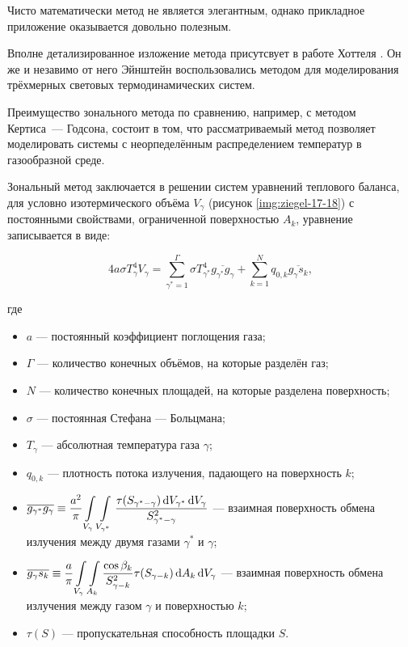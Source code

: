 Чисто математически метод не является элегантным, однако прикладное приложение оказывается довольно полезным.

Вполне детализированное изложение метода присутсвует в работе Хоттеля \cite{hottel-1}.
Он же \cite{hottel-2} и незавимо от него Эйнштейн \cite{einstein-1, einstein-2} воспользовались методом для моделирования трёхмерных световых термодинамических систем.

Преимущество зонального метода по сравнению, например, с методом Кертиса~— Годсона, состоит в том, что рассматриваемый метод позволяет моделировать системы с неорпеделённым распределением температур в газообразной среде.


Зональный метод заключается в решении систем уравнений теплового баланса, для условно изотермического объёма $V_\gamma$ (рисунок \ref{img:ziegel-17-18}) с постоянными свойствами, ограниченной поверхностью $A_k$, уравнение записывается в виде:

\begin{equation}
	4a\sigma T^4_\gamma V_\gamma = \sum_{\gamma^* = 1}^{\Gamma} \sigma T^4_{\gamma^*} \overline{g_{\gamma^*} g_\gamma} + \sum_{k=1}^{N} q_{0, k} \overline{g_\gamma s_k},
\end{equation}

\noindent где
\begin{itemize}
	\item $a$ — постоянный коэффициент поглощения газа;
	\item $\Gamma$ — количество конечных объёмов, на которые разделён газ;
	\item $N$ — количество конечных площадей, на которые разделена поверхность;
	\item $\sigma$ — постоянная Стефана — Больцмана;
	\item $T_\gamma$ — абсолютная температура газа $\gamma$;
	\item $q_{0, k}$ — плотность потока излучения, падающего на поверхность $k$;
	\item $\displaystyle \overline{g_{\gamma^*} g_\gamma} \equiv \frac{a^2}{\pi} \int\displaylimits_{V_\gamma} \int\displaylimits_{V_{\gamma^*}} \frac{\tau(S_{\gamma^*-\gamma}) \,\mathrm dV_{\gamma^*} \,\mathrm dV_\gamma}{S^2_{\gamma^*-\gamma}}$ — взаимная поверхность обмена излучения между двумя газами $\gamma^*$ и $\gamma$;
	\item $\displaystyle \overline{g_\gamma s_k} \equiv \frac a\pi  \int\displaylimits_{V_\gamma} \int\displaylimits_{A_k} \frac{\cos{\beta_k}}{S^2_{\gamma-k}} \tau (S_{\gamma - k}) \,\mathrm dA_k \, \mathrm dV_\gamma$ — взаимная поверхность обмена излучения между газом $\gamma$ и поверхностью $k$;
	\item $\tau(S)$ — пропускательная способность площадки $S$.
\end{itemize}

